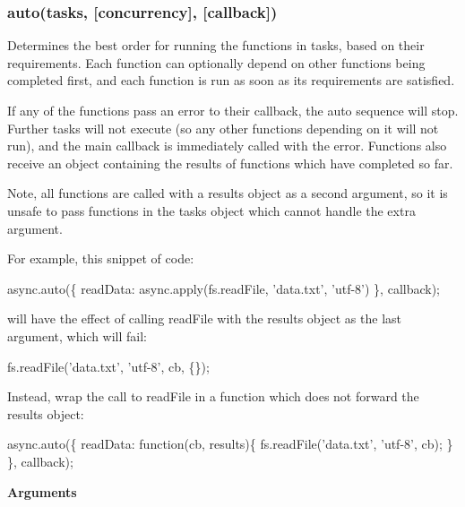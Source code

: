  \subsubsection*{auto(tasks, \mbox{[}concurrency\mbox{]}, \mbox{[}callback\mbox{]})}

Determines the best order for running the functions in {\ttfamily tasks}, based on their requirements. Each function can optionally depend on other functions being completed first, and each function is run as soon as its requirements are satisfied.

If any of the functions pass an error to their callback, the {\ttfamily auto} sequence will stop. Further tasks will not execute (so any other functions depending on it will not run), and the main {\ttfamily callback} is immediately called with the error. Functions also receive an object containing the results of functions which have completed so far.

Note, all functions are called with a {\ttfamily results} object as a second argument, so it is unsafe to pass functions in the {\ttfamily tasks} object which cannot handle the extra argument.

For example, this snippet of code\+:


\begin{DoxyCode}
async.auto(\{
  readData: async.apply(fs.readFile, 'data.txt', 'utf-8')
\}, callback);
\end{DoxyCode}


will have the effect of calling {\ttfamily read\+File} with the results object as the last argument, which will fail\+:


\begin{DoxyCode}
fs.readFile('data.txt', 'utf-8', cb, \{\});
\end{DoxyCode}


Instead, wrap the call to {\ttfamily read\+File} in a function which does not forward the {\ttfamily results} object\+:


\begin{DoxyCode}
async.auto(\{
  readData: function(cb, results)\{
    fs.readFile('data.txt', 'utf-8', cb);
  \}
\}, callback);
\end{DoxyCode}


{\bfseries Arguments}


